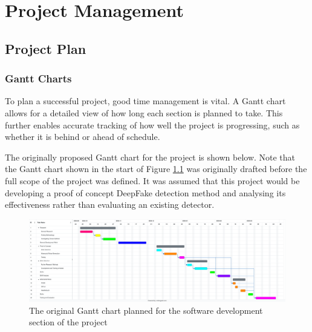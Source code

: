 \chapter{Project Management}
\label{ch:projman}

\section{Project Plan}


\subsection{Gantt Charts}

To plan a successful project, good time management is vital. A Gantt chart allows for a detailed view of how long each section is planned to take. This further enables accurate tracking of how well the project is progressing, such as whether it is behind or ahead of schedule.

The originally proposed Gantt chart for the project is shown below. Note that the Gantt chart shown in the start of Figure \ref{fig:original-gantt} was originally drafted before the full scope of the project was defined. It was assumed that this project would be developing a proof of concept DeepFake detection method and analysing its effectiveness rather than evaluating an existing detector.

\begin{figure}[h]
    \centering
    \includegraphics[width=1\linewidth]{dissertation/figures/original-gantt.png}
    \caption{The original Gantt chart planned for the software development section of the project}
    \label{fig:original-gantt}
\end{figure}

